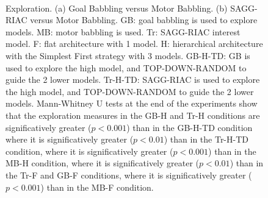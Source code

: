 \documentclass[12pt]{article}
\begin{document}
		\begin{figure}[H]
			\centering
			\\
			\caption{Exploration. (a) Goal Babbling versus Motor Babbling. (b) SAGG-RIAC versus Motor Babbling. GB: goal babbling is used to explore models. MB: motor babbling is used. Tr: SAGG-RIAC interest model. F: flat architecture with 1 model. 
					 H: hierarchical architecture with the Simplest First strategy with 3 models. GB-H-TD: GB is used to explore the high model, and TOP-DOWN-RANDOM to guide the 2 lower models. Tr-H-TD: SAGG-RIAC is used to explore the high model, and TOP-DOWN-RANDOM to guide the 2 lower models.
					 Mann-Whitney U tests at the end of the experiments show that the exploration measures in the GB-H and Tr-H conditions
			are significatively greater ($p<0.001$) than in the GB-H-TD condition where it is significatively greater ($p<0.01$) than in the Tr-H-TD condition, 
			where it is significatively greater ($p<0.001$) than in the MB-H condition, 
			where it is significatively greater ($p<0.01$) than in the Tr-F and GB-F conditions, 
			where it is significatively greater ($p<0.001$) than in the MB-F condition.}
			\label{explo_armseq}
		\end{figure}
\end{document}
